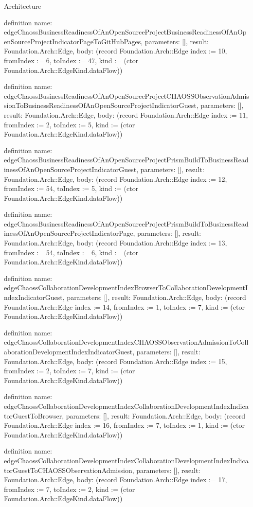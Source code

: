 \begin{lexlean}{Architecture}
\begin{semanticmodule}
definition{
  name: edgeChaossBusinessReadinessOfAnOpenSourceProjectBusinessReadinessOfAnOpenSourceProjectIndicatorPageToGitHubPages,
  parameters: [],
  result: Foundation.Arch::Edge,
  body: (record Foundation.Arch::Edge {index := 10, fromIndex := 6, toIndex := 47, kind := (ctor Foundation.Arch::EdgeKind.dataFlow)})
}

definition{
  name: edgeChaossBusinessReadinessOfAnOpenSourceProjectCHAOSSObservationAdmissionToBusinessReadinessOfAnOpenSourceProjectIndicatorGuest,
  parameters: [],
  result: Foundation.Arch::Edge,
  body: (record Foundation.Arch::Edge {index := 11, fromIndex := 2, toIndex := 5, kind := (ctor Foundation.Arch::EdgeKind.dataFlow)})
}

definition{
  name: edgeChaossBusinessReadinessOfAnOpenSourceProjectPrismBuildToBusinessReadinessOfAnOpenSourceProjectIndicatorGuest,
  parameters: [],
  result: Foundation.Arch::Edge,
  body: (record Foundation.Arch::Edge {index := 12, fromIndex := 54, toIndex := 5, kind := (ctor Foundation.Arch::EdgeKind.dataFlow)})
}

definition{
  name: edgeChaossBusinessReadinessOfAnOpenSourceProjectPrismBuildToBusinessReadinessOfAnOpenSourceProjectIndicatorPage,
  parameters: [],
  result: Foundation.Arch::Edge,
  body: (record Foundation.Arch::Edge {index := 13, fromIndex := 54, toIndex := 6, kind := (ctor Foundation.Arch::EdgeKind.dataFlow)})
}

definition{
  name: edgeChaossCollaborationDevelopmentIndexBrowserToCollaborationDevelopmentIndexIndicatorGuest,
  parameters: [],
  result: Foundation.Arch::Edge,
  body: (record Foundation.Arch::Edge {index := 14, fromIndex := 1, toIndex := 7, kind := (ctor Foundation.Arch::EdgeKind.dataFlow)})
}

definition{
  name: edgeChaossCollaborationDevelopmentIndexCHAOSSObservationAdmissionToCollaborationDevelopmentIndexIndicatorGuest,
  parameters: [],
  result: Foundation.Arch::Edge,
  body: (record Foundation.Arch::Edge {index := 15, fromIndex := 2, toIndex := 7, kind := (ctor Foundation.Arch::EdgeKind.dataFlow)})
}

definition{
  name: edgeChaossCollaborationDevelopmentIndexCollaborationDevelopmentIndexIndicatorGuestToBrowser,
  parameters: [],
  result: Foundation.Arch::Edge,
  body: (record Foundation.Arch::Edge {index := 16, fromIndex := 7, toIndex := 1, kind := (ctor Foundation.Arch::EdgeKind.dataFlow)})
}

definition{
  name: edgeChaossCollaborationDevelopmentIndexCollaborationDevelopmentIndexIndicatorGuestToCHAOSSObservationAdmission,
  parameters: [],
  result: Foundation.Arch::Edge,
  body: (record Foundation.Arch::Edge {index := 17, fromIndex := 7, toIndex := 2, kind := (ctor Foundation.Arch::EdgeKind.dataFlow)})
}


\end{semanticmodule}
\end{lexlean}
